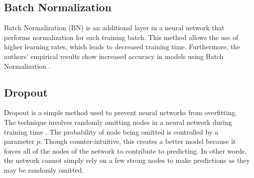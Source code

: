 \subsection{Batch Normalization}
Batch Normalization (BN) is an additional layer in a neural network that performs normalization for each training batch. This method allows the use of higher learning rates, which leads to decreased training time. Furthermore, the authors' empirical results show increased accuracy in models using Batch Normalization \cite{batchnorm}.
\subsection{Dropout}
Dropout is a simple method used to prevent neural networks from overfitting. The technique involves randomly omitting nodes in a neural network during training time \cite{dropout}. The probability of node being omitted is controlled by a parameter $p$. Though counter-intuitive, this creates a better model because it forces all of the nodes of the network to contribute to predicting. In other words, the network cannot simply rely on a few strong nodes to make predictions as they may be randomly omitted.